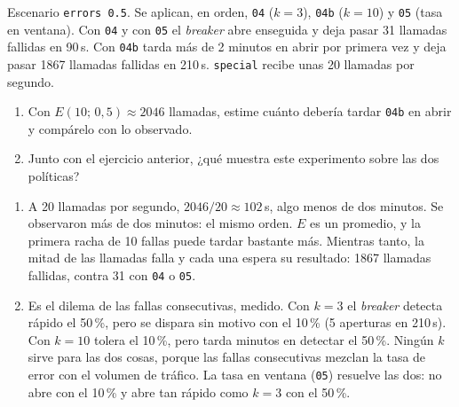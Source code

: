 \documentclass[variant=guia,cover=institutional,mode=screen]{ua-engineering-v6-article}
\begin{document}
\begin{uaexercise}
Escenario \texttt{errors 0.5}. Se aplican, en orden, \texttt{04} ($k = 3$), \texttt{04b} ($k = 10$) y \texttt{05} (tasa en ventana). Con \texttt{04} y con \texttt{05} el \emph{breaker} abre enseguida y deja pasar 31 llamadas fallidas en 90\,s. Con \texttt{04b} tarda más de 2 minutos en abrir por primera vez y deja pasar 1867 llamadas fallidas en 210\,s. \texttt{special} recibe unas 20 llamadas por segundo.
\begin{enumerate}
\item Con $E(10;\,0{,}5) \approx 2046$ llamadas, estime cuánto debería tardar \texttt{04b} en abrir y compárelo con lo observado.
\item Junto con el ejercicio anterior, ¿qué muestra este experimento sobre las dos políticas?
\end{enumerate}
\end{uaexercise}
\begin{uaanswer}
\begin{enumerate}
\item A 20 llamadas por segundo, $2046 / 20 \approx 102$\,s, algo menos de dos minutos. Se observaron más de dos minutos: el mismo orden. $E$ es un promedio, y la primera racha de 10 fallas puede tardar bastante más. Mientras tanto, la mitad de las llamadas falla y cada una espera su resultado: 1867 llamadas fallidas, contra 31 con \texttt{04} o \texttt{05}.
\item Es el dilema de las fallas consecutivas, medido. Con $k = 3$ el \emph{breaker} detecta rápido el 50\,\%, pero se dispara sin motivo con el 10\,\% (5 aperturas en 210\,s). Con $k = 10$ tolera el 10\,\%, pero tarda minutos en detectar el 50\,\%. Ningún $k$ sirve para las dos cosas, porque las fallas consecutivas mezclan la tasa de error con el volumen de tráfico. La tasa en ventana (\texttt{05}) resuelve las dos: no abre con el 10\,\% y abre tan rápido como $k = 3$ con el 50\,\%.
\end{enumerate}
\end{uaanswer}
\end{document}
